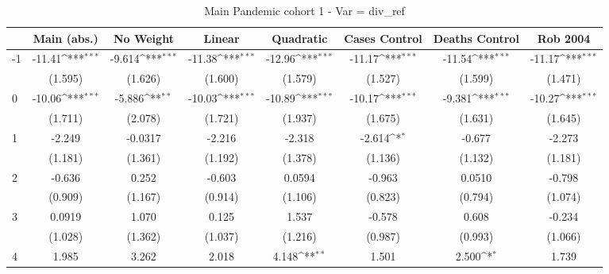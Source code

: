 \documentclass{article}
\begin{document}
{
\def\sym#1{\ifmmode^{#1}\else\(^{#1}\)\fi}
\begin{longtable}{l*{7}{c}}
\caption{Main Pandemic cohort 1 - Var = div\_ref}\\
\hline\hline\endfirsthead\hline\endhead\hline\endfoot\endlastfoot
                &\multicolumn{1}{c}{Main (abs.)}&\multicolumn{1}{c}{No Weight}&\multicolumn{1}{c}{Linear}&\multicolumn{1}{c}{Quadratic}&\multicolumn{1}{c}{Cases Control}&\multicolumn{1}{c}{Deaths Control}&\multicolumn{1}{c}{Rob 2004}\\
\hline
-1              &   -11.41\sym{***}&   -9.614\sym{***}&   -11.38\sym{***}&   -12.96\sym{***}&   -11.17\sym{***}&   -11.54\sym{***}&   -11.17\sym{***}\\
                &  (1.595)         &  (1.626)         &  (1.600)         &  (1.579)         &  (1.527)         &  (1.599)         &  (1.471)         \\
0               &   -10.06\sym{***}&   -5.886\sym{**} &   -10.03\sym{***}&   -10.89\sym{***}&   -10.17\sym{***}&   -9.381\sym{***}&   -10.27\sym{***}\\
                &  (1.711)         &  (2.078)         &  (1.721)         &  (1.937)         &  (1.675)         &  (1.631)         &  (1.645)         \\
1               &   -2.249         &  -0.0317         &   -2.216         &   -2.318         &   -2.614\sym{*}  &   -0.677         &   -2.273         \\
                &  (1.181)         &  (1.361)         &  (1.192)         &  (1.378)         &  (1.136)         &  (1.132)         &  (1.181)         \\
2               &   -0.636         &    0.252         &   -0.603         &   0.0594         &   -0.963         &   0.0510         &   -0.798         \\
                &  (0.909)         &  (1.167)         &  (0.914)         &  (1.106)         &  (0.823)         &  (0.794)         &  (1.074)         \\
3               &   0.0919         &    1.070         &    0.125         &    1.537         &   -0.578         &    0.608         &   -0.234         \\
                &  (1.028)         &  (1.362)         &  (1.037)         &  (1.216)         &  (0.987)         &  (0.993)         &  (1.066)         \\
4               &    1.985         &    3.262         &    2.018         &    4.148\sym{**} &    1.501         &    2.500\sym{*}  &    1.739         \\

\end{longtable}}
\end{document}

